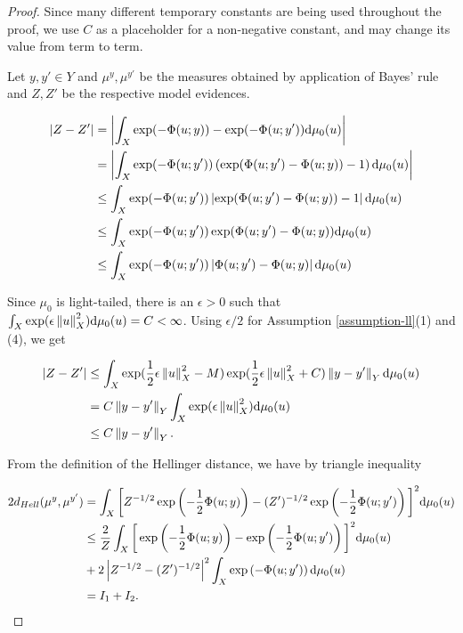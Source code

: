 \begin{proof}
  Since many different temporary constants are being used throughout the proof, we use $C$ as a placeholder for a non-negative constant, and may change its value from term to term.

  Let $y, y' \in Y$ and  $\mu^y, \mu^{y'}$ be the measures obtained by application of Bayes' rule and $Z, Z'$ be the respective model evidences.

  \begin{equation*}
    \begin{aligned}
      |Z - Z'|
      &= \left|\int_X \exp(-\Phi(u; y)) - \exp(-\Phi(u; y'))  \text{d} \mu_0(u)\right|\\
      &= \left|\int_X \exp(-\Phi(u; y'))\left(\exp(\Phi(u; y')-\Phi(u; y)) - 1\right)  \text{d} \mu_0(u)\right|\\
      &\le \int_X \exp(-\Phi(u; y'))\left|\exp(\Phi(u; y')-\Phi(u; y)) - 1\right| \text{d} \mu_0(u)\\
      &\le \int_X \exp(-\Phi(u; y'))\exp(\Phi(u; y')-\Phi(u; y)) \text{d} \mu_0(u)\\
      &\le \int_X \exp(-\Phi(u; y'))\left|\Phi(u; y')-\Phi(u; y)\right| \text{d} \mu_0(u)
    \end{aligned}
  \end{equation*}

  Since $\mu_0$ is light-tailed, there is an $\epsilon > 0$ such that $\int_X\exp(\epsilon \left\lVert u\right\rVert_X^2)\text{d} \mu_0(u) = C < \infty$. Using $\epsilon / 2$ for Assumption \ref{assumption-ll}(1) and (4), we get

  \begin{equation}\label{bound-z}
    \begin{aligned}
      |Z - Z'|
      &\le \int_X \exp(\frac12\epsilon\left\lVert u\right\rVert_X^2 - M)\exp(\frac12\epsilon\left\lVert u\right\rVert_X^2 + C)\left\lVert y - y'\right\rVert_Y \text{d}\mu_0(u) \\
      &= C  \left\lVert y - y'\right\rVert_Y \int_X \exp(\epsilon\left\lVert u\right\rVert_X^2) \text{d}\mu_0(u)\\
      &\le C\left\lVert y - y'\right\rVert_Y.
      \end{aligned}
  \end{equation}

  From the definition of the Hellinger distance, we have by triangle inequality

  \begin{equation*}
    \begin{aligned}
      2d_{Hell}(\mu^y, \mu^{y'}) &= \int_X\bigg[Z^{-1/2}\exp\left(-\frac12\Phi(u;y)\right) - (Z')^{-1/2}\exp\left(-\frac12\Phi(u; y')\right)\bigg]^2\text{d}\mu_0(u)\\
      &\le \frac2Z\int_X\bigg[\exp\left(-\frac12\Phi(u;y)\right) - \exp\left(-\frac12\Phi(u; y')\right)\bigg]^2\text{d}\mu_0(u)\\
      &+ 2\left|Z^{-1/2} - (Z')^{-1/2}\right|^2\int_X\exp\left(-\Phi(u; y')\right)\text{d}\mu_0(u)\\
      &= I_1 + I_2.
    \end{aligned}
  \end{equation*}
  

\end{proof}
